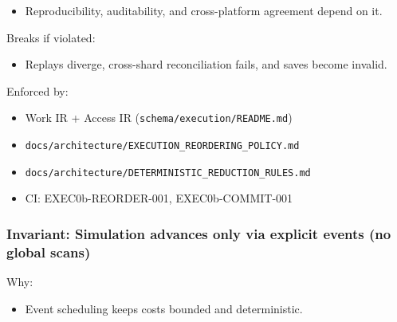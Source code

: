 \documentclass[9pt,a4paper,openany]{book}
\begin{document}
\begin{itemize}
\item Reproducibility, auditability, and cross-\allowbreak{}platform agreement depend on it.\allowbreak{}
\end{itemize}


Breaks if violated:



\begin{itemize}
\item Replays diverge, cross-\allowbreak{}shard reconciliation fails, and saves become invalid.\allowbreak{}
\end{itemize}


Enforced by:



\begin{itemize}
\item Work IR + Access IR (\texttt{schema/\allowbreak{}execution/\allowbreak{}README.\allowbreak{}md})
\end{itemize}


\begin{itemize}
\item \texttt{docs/\allowbreak{}architecture/\allowbreak{}EXECUTION\_\allowbreak{}REORDERING\_\allowbreak{}POLICY.\allowbreak{}md}
\end{itemize}


\begin{itemize}
\item \texttt{docs/\allowbreak{}architecture/\allowbreak{}DETERMINISTIC\_\allowbreak{}REDUCTION\_\allowbreak{}RULES.\allowbreak{}md}
\end{itemize}


\begin{itemize}
\item CI: EXEC0b-\allowbreak{}REORDER-\allowbreak{}001, EXEC0b-\allowbreak{}COMMIT-\allowbreak{}001
\end{itemize}





\subsubsection{Invariant: Simulation advances only via explicit events (no global scans)}


Why:



\begin{itemize}
\item Event scheduling keeps costs bounded and deterministic.\allowbreak{}
\end{itemize}
\end{document}
